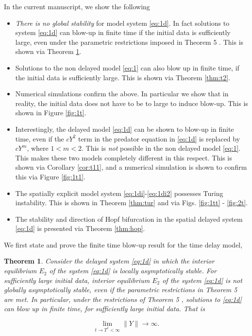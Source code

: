 \documentclass[10pt]{amsart}
\newtheorem{theorem}{Theorem}[section]
\theoremstyle{definition}
\begin{document}
In the current manuscript, we show the following
\begin{itemize}
\item \emph{There is no global stability} for model system \eqref{eq:1d}. In fact solutions to system \eqref{eq:1d} can blow-up in finite time if the initial data is sufficiently large, even under the parametric restrictions imposed in Theorem 5  \cite{RK15}. This is shown via Theorem \ref{thm:t1}.

\item Solutions to the non delayed model \eqref{eq:1} can also blow up in finite time, if the initial data is sufficiently large. This is shown via Theorem \ref{thm:t2}.

\item Numerical simulations confirm the above. In particular we show that in reality, the initial data does not have to be to large to induce blow-up. This is shown in Figure  \ref{fig:1t}. 

\item Interestingly, the delayed model \eqref{eq:1d} can be shown to blow-up in finite time, even if the $cY^2$ term in the predator equation in \eqref{eq:1d} is replaced by $cY^m$, where $1 < m < 2$. This is \emph{not} possible in the non delayed model \eqref{eq:1}. This makes these two models completely different in this respect. This is shown via Corollary \ref{cor:t11}, and a numerical simulation is shown to confirm this via Figure \ref{fig:1t1}.

\item The spatially explicit model system \eqref{eq:1di}-\eqref{eq:1di2} possesses Turing instability. This is shown in Theorem \ref{thm:tur} and via Figs. \ref{fig:1tt} - \ref{fig:2t}. 

\item The stability and direction of Hopf bifurcation in the spatial delayed system \eqref{eq:1d} is presented via Theorem \ref{thm:hop}.
\end{itemize}

We first state and prove the finite time blow-up result for the time delay model,

\begin{theorem}
\label{thm:t1}
Consider the delayed system \eqref{eq:1d} in which the interior equilibrium $E_{2}$ of the system \eqref{eq:1d} is locally asymptotically stable. For sufficiently large initial data,  interior equilibrium $E_{2}$ of the system \eqref{eq:1d} is not globally asymptotically stable, even if the parametric restrictions in Theorem 5 \cite{RK15} are met. In particular, under the restrictions of Theorem 5 \cite{RK15}, solutions to \eqref{eq:1d} can blow up in finite time, for sufficiently large initial data. That is

\begin{equation*}
\lim_{t\rightarrow T^{\ast}<\infty}\| Y \| \rightarrow \infty.
 \end{equation*}

\end{theorem}
\end{document}
